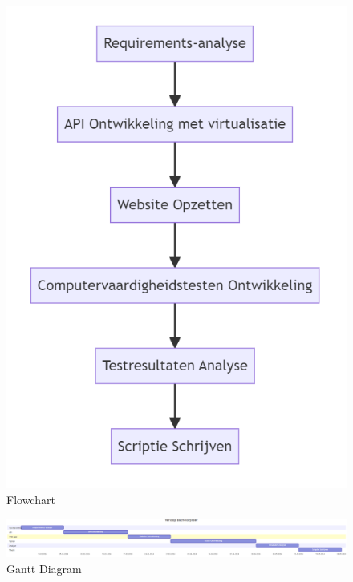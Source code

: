 \begin{figure}[ht]
  \centering
  \includegraphics[width=\linewidth]{./graphics/flowchart.png}
  \caption{Flowchart}
  \label{fig:flowchart}
\end{figure}

\begin{figure}[ht]
  \centering
  \includegraphics[width=\linewidth]{./graphics/gantt.png}
  \caption{Gantt Diagram}
  \label{fig:gantt}
\end{figure}




